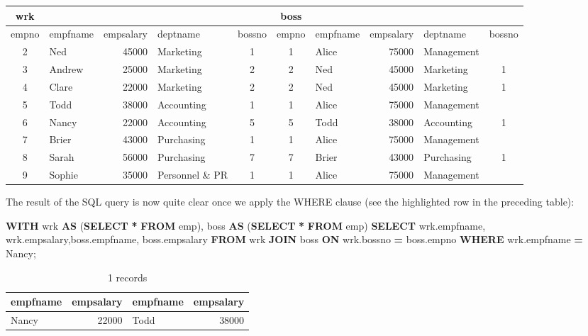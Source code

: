 \documentclass[
]{article}
\newenvironment{Shaded}{\begin{snugshade}}{\end{snugshade}}
\newcommand{\KeywordTok}[1]{\textcolor[rgb]{0.13,0.29,0.53}{\textbf{#1}}}
\newcommand{\NormalTok}[1]{#1}
\newcommand{\OperatorTok}[1]{\textcolor[rgb]{0.81,0.36,0.00}{\textbf{#1}}}
\newcommand{\StringTok}[1]{\textcolor[rgb]{0.31,0.60,0.02}{#1}}
\begin{document}
\begin{longtable}[]{@{}clrlcclrlc@{}}
\toprule
wrk & & & & & boss & & & & \\
\midrule
\endhead
empno & empfname & empsalary & deptname & bossno & empno & empfname & empsalary & deptname & bossno \\
2 & Ned & 45000 & Marketing & 1 & 1 & Alice & 75000 & Management & \\
3 & Andrew & 25000 & Marketing & 2 & 2 & Ned & 45000 & Marketing & 1 \\
4 & Clare & 22000 & Marketing & 2 & 2 & Ned & 45000 & Marketing & 1 \\
5 & Todd & 38000 & Accounting & 1 & 1 & Alice & 75000 & Management & \\
6 & Nancy & 22000 & Accounting & 5 & 5 & Todd & 38000 & Accounting & 1 \\
7 & Brier & 43000 & Purchasing & 1 & 1 & Alice & 75000 & Management & \\
8 & Sarah & 56000 & Purchasing & 7 & 7 & Brier & 43000 & Purchasing & 1 \\
9 & Sophie & 35000 & Personnel \& PR & 1 & 1 & Alice & 75000 & Management & \\
\bottomrule
\end{longtable}

The result of the SQL query is now quite clear once we apply the WHERE
clause (see the highlighted row in the preceding table):

\begin{Shaded}
\begin{Highlighting}[]
\KeywordTok{WITH}
\NormalTok{wrk }\KeywordTok{AS}\NormalTok{ (}\KeywordTok{SELECT} \OperatorTok{*} \KeywordTok{FROM}\NormalTok{ emp), }
\NormalTok{boss }\KeywordTok{AS}\NormalTok{ (}\KeywordTok{SELECT} \OperatorTok{*} \KeywordTok{FROM}\NormalTok{ emp) }
\KeywordTok{SELECT}\NormalTok{ wrk.empfname, wrk.empsalary,boss.empfname, boss.empsalary}
    \KeywordTok{FROM}\NormalTok{ wrk }\KeywordTok{JOIN}\NormalTok{ boss }
        \KeywordTok{ON}\NormalTok{ wrk.bossno }\OperatorTok{=}\NormalTok{ boss.empno}
        \KeywordTok{WHERE}\NormalTok{ wrk.empfname }\OperatorTok{=} \StringTok{\textquotesingle{}Nancy\textquotesingle{}}\NormalTok{;}
\end{Highlighting}
\end{Shaded}

\begin{table}

\caption{\label{tab:unnamed-chunk-79}1 records}
\centering
\begin{tabular}[t]{l|r|l|r}
\hline
empfname & empsalary & empfname & empsalary\\
\hline
Nancy & 22000 & Todd & 38000\\
\hline
\end{tabular}
\end{table}
\end{document}
